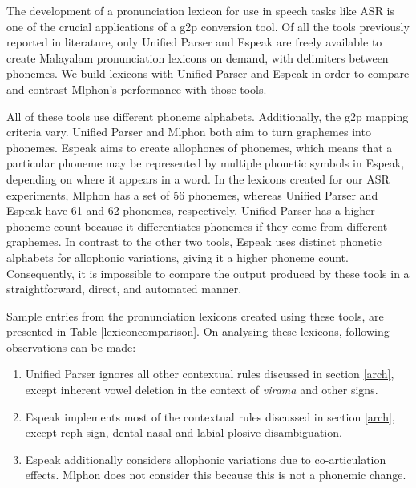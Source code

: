 \documentclass{ieeeaccess}
\begin{document}
The development of a pronunciation lexicon for use in speech tasks like ASR is one of the crucial applications of a g2p conversion tool. Of all the tools previously reported in literature, only Unified Parser and Espeak  are freely available to create Malayalam pronunciation lexicons on demand, with delimiters between phonemes. We build lexicons with Unified Parser and Espeak in order to compare and contrast Mlphon's performance with those tools. 

All of these tools use different phoneme alphabets. Additionally, the g2p mapping criteria vary. Unified Parser and Mlphon both aim to turn graphemes into phonemes. Espeak aims to create allophones of phonemes, which means that a particular phoneme may be represented by multiple phonetic symbols in Espeak, depending on where it appears in a word.  In the lexicons created for our ASR experiments, Mlphon has a set of 56 phonemes, whereas Unified Parser and Espeak have 61 and 62 phonemes, respectively. Unified Parser has a higher phoneme count because it differentiates  phonemes if they come from different graphemes. In contrast to the other two tools, Espeak uses distinct phonetic alphabets for allophonic variations, giving it a higher phoneme count.  Consequently, it is impossible to compare the output produced by these tools in a straightforward, direct, and automated manner.

Sample entries from the pronunciation lexicons created using these tools, are presented in Table \ref{lexiconcomparison}. On analysing these lexicons, following observations can be made:

\begin{enumerate}
    \item Unified Parser ignores all other contextual rules discussed in section \ref{arch}, except inherent vowel deletion in the context of \textit{virama} and other signs.
    \item Espeak implements most of the contextual rules discussed in section \ref{arch}, except reph sign, dental nasal and labial plosive disambiguation.
    \item Espeak additionally considers allophonic variations due to co-articulation effects. Mlphon does not consider this because this is not a phonemic change.
\end{enumerate}
\end{document}
